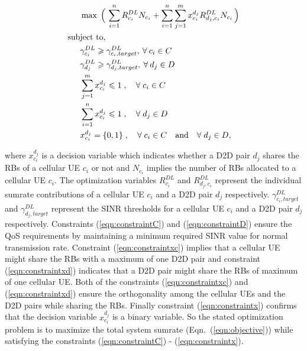 \documentclass[times]{dacauth}
\begin{document}
\begin{align}
&\max \; \Big(\, \sum_{i=1}^{n} R_{c_i}^{DL}N_{c_i} + \sum_{i=1}^{n}\sum_{j=1}^{m} x_{c_i}^{d_j} R_{d_j,c_i}^{DL}N_{c_i} \, \Big) \label{eqn:objective} \\
\text{sub}&\text{ject}\text{ to,}\notag\\
&\gamma_{c_i}^{DL} \geqslant \gamma_{c_i,target}^{DL}, \: \forall \:c_i\in C \label{eqn:constraintC} \\
&\gamma_{d_j}^{DL} \geqslant \gamma_{d_j,target}^{DL}, \: \forall \:d_j\in D \label{eqn:constraintD}\\
&\sum_{j=1}^{m}x_{c_i}^{d_j} \leqslant 1\;,\quad \forall \;c_i \in C \label{eqn:constraintxc}\\
&\sum_{i=1}^{n}x_{c_i}^{d_j} \leqslant 1\;,\quad \forall \;d_j \in D \label{eqn:constraintxd}\\
&x_{c_i}^{d_j} = \{0,1\}\;,  		 \quad \forall \;c_i \in C \quad  \text{and} \quad \forall \;d_j \in D, \label{eqn:constraintx}
\end{align}

\noindent
where $x_{c_i}^{d_j}$ is a decision variable which indicates whether a D2D pair $d_j$  shares the RBs of a cellular UE $c_i$ or not and $N_{c_i}$ implies the number of RBs allocated to a cellular UE $c_i$. The optimization variables  $R_{c_i}^{DL}$ and $R_{d_j,c_i}^{DL}$ represent the individual sumrate contributions of a cellular UE $c_i$ and a D2D pair $d_j$ respectively. $\gamma_{c_i,target}^{DL}$ and $\gamma_{d_j,target}^{DL}$ represent the SINR thresholds for a cellular UE $c_i$ and a D2D pair $d_j$ respectively. Constraints (\ref{eqn:constraintC}) and (\ref{eqn:constraintD}) ensure the QoS requirements by maintaining a minimum required SINR value for normal transmission rate. Constraint (\ref{eqn:constraintxc}) implies that a cellular UE might share the RBs with a maximum of one D2D pair and constraint (\ref{eqn:constraintxd}) indicates that a D2D pair might share the RBs of maximum of one cellular UE. Both of the constraints (\ref{eqn:constraintxc}) and (\ref{eqn:constraintxd}) ensure the orthogonality among the cellular UEs and the D2D pairs while sharing the RBs. Finally constraint (\ref{eqn:constraintx}) confirms that the decision variable $x_{c_i}^{d_j}$ is a binary variable. So the stated optimization problem is to maximize the total system sumrate (Eqn.~(\ref{eqn:objective})) while satisfying the constraints (\ref{eqn:constraintC}) - (\ref{eqn:constraintx}).
\end{document}
